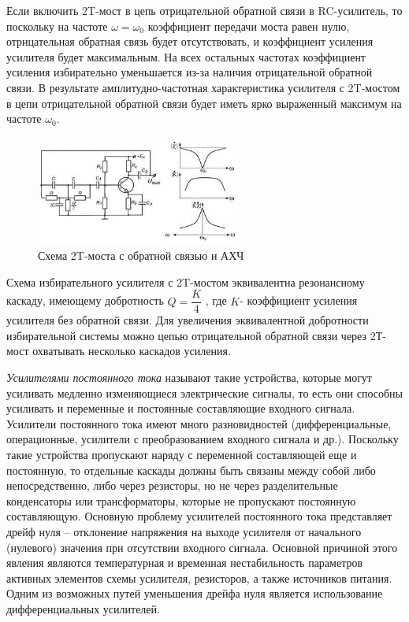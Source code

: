 \documentclass[unicode, 12pt, a4paper, oneside]{article}
\begin{document}
Если включить 2T-мост в цепь отрицательной обратной связи в RC-усилитель, то поскольку на частоте $\omega = \omega_{0}$ коэффициент передачи моста равен нулю, отрицательная обратная связь будет отсутствовать, и коэффициент усиления усилителя будет максимальным. На всех остальных частотах коэффициент усиления избирательно уменьшается из-за наличия отрицательной обратной связи. В результате амплитудно-частотная характеристика усилителя с 2T-мостом в цепи отрицательной обратной связи будет иметь ярко выраженный максимум на частоте $\omega_{0}$.

\begin{figure}[H]
\centering
\includegraphics[width=0.6\textwidth]{7_2T_with_feedback.jpg}
\caption{Схема 2T-моста с обратной связью и АХЧ}
\label{fig:7_2T_with_feedback}
\end{figure}

Схема избирательного усилителя с 2T-мостом эквивалентна резонансному каскаду, имеющему добротность $Q = \dfrac{K}{4}$ , где $K$- коэффициент усиления усилителя без обратной связи. Для увеличения эквивалентной добротности избирательной системы можно цепью отрицательной обратной связи через 2Т-мост охватывать несколько каскадов усиления.

\textit{Усилителями постоянного тока} называют такие устройства, которые могут усиливать медленно изменяющиеся электрические сигналы, то есть они способны усиливать и переменные и постоянные составляющие входного сигнала. Усилители постоянного тока имеют много разновидностей (дифференциальные, операционные, усилители с преобразованием входного сигнала и др.). Поскольку такие устройства пропускают наряду с переменной составляющей еще и постоянную, то отдельные каскады должны быть связаны между собой либо непосредственно, либо через резисторы, но не через разделительные конденсаторы или трансформаторы, которые не пропускают постоянную составляющую. Основную проблему усилителей постоянного тока представляет дрейф нуля – отклонение напряжения на выходе усилителя от начального (нулевого) значения при отсутствии входного сигнала. Основной причиной этого явления являются температурная и временная нестабильность параметров активных элементов схемы усилителя, резисторов, а также источников питания. Одним из возможных путей уменьшения дрейфа нуля является использование дифференциальных усилителей.
\end{document}
